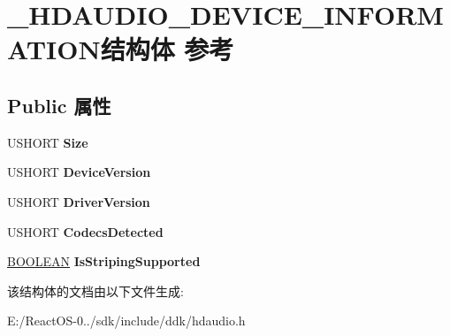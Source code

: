 \hypertarget{struct___h_d_a_u_d_i_o___d_e_v_i_c_e___i_n_f_o_r_m_a_t_i_o_n}{}\section{\+\_\+\+H\+D\+A\+U\+D\+I\+O\+\_\+\+D\+E\+V\+I\+C\+E\+\_\+\+I\+N\+F\+O\+R\+M\+A\+T\+I\+O\+N结构体 参考}
\label{struct___h_d_a_u_d_i_o___d_e_v_i_c_e___i_n_f_o_r_m_a_t_i_o_n}
\subsection*{Public 属性}
\begin{DoxyCompactItemize}
\item 
\mbox{\label{struct___h_d_a_u_d_i_o___d_e_v_i_c_e___i_n_f_o_r_m_a_t_i_o_n_a432163425009c1eb0080d2cd39092062}} 
U\+S\+H\+O\+RT {\bfseries Size}
\item 
\mbox{\label{struct___h_d_a_u_d_i_o___d_e_v_i_c_e___i_n_f_o_r_m_a_t_i_o_n_a0e5d659412583cff93ede610f8f100d8}} 
U\+S\+H\+O\+RT {\bfseries Device\+Version}
\item 
\mbox{\label{struct___h_d_a_u_d_i_o___d_e_v_i_c_e___i_n_f_o_r_m_a_t_i_o_n_a90523b669ed6ded34dafb689d0b23f8b}} 
U\+S\+H\+O\+RT {\bfseries Driver\+Version}
\item 
\mbox{\label{struct___h_d_a_u_d_i_o___d_e_v_i_c_e___i_n_f_o_r_m_a_t_i_o_n_a2d84d83accace814bf0e1c005db74526}} 
U\+S\+H\+O\+RT {\bfseries Codecs\+Detected}
\item 
\mbox{\label{struct___h_d_a_u_d_i_o___d_e_v_i_c_e___i_n_f_o_r_m_a_t_i_o_n_a4b412e401077e04ecedf131ab5bf5d20}} 
\hyperlink{_processor_bind_8h_a112e3146cb38b6ee95e64d85842e380a}{B\+O\+O\+L\+E\+AN} {\bfseries Is\+Striping\+Supported}
\end{DoxyCompactItemize}


该结构体的文档由以下文件生成\+:\begin{DoxyCompactItemize}
\item 
E\+:/\+React\+O\+S-\/0../sdk/include/ddk/hdaudio.\+h\end{DoxyCompactItemize}
